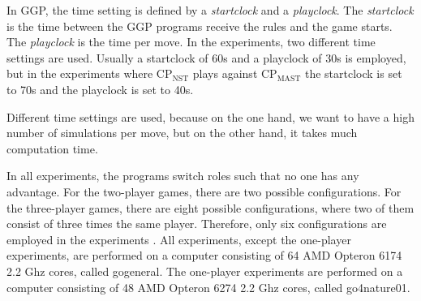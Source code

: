 \documentclass[journal]{IEEEtran}
\begin{document}

In GGP, the time setting is defined by a \textit{startclock} and a \textit{playclock}. The \textit{startclock} is the time between the GGP programs receive the rules and the game starts. The \textit{playclock} is the time per move. In the experiments, two different time settings are used. Usually a startclock of 60s and a playclock of 30s is employed, but in the experiments where CP$_{\textrm{NST}}$ plays against CP$_{\textrm{MAST}}$ the startclock is set to 70s and the playclock is set to 40s. 

Different time settings are used, because on the one hand, we want to have a high number of simulations per move, but on the other hand, it takes much computation time.

In all experiments, the programs switch roles such that no one has any advantage. For the two-player games, there are two possible configurations. For the three-player games, there are eight possible configurations, where two of them consist of three times the same player. Therefore, only six  configurations are employed in the experiments \cite{Sturtevant2008}. All experiments, except the one-player experiments, are performed on 
a computer consisting of 64 AMD Opteron 6174 2.2 Ghz cores, called gogeneral. The one-player experiments are performed on a computer consisting of 48 AMD Opteron 6274 2.2 Ghz cores, called go4nature01. %

\end{document}
